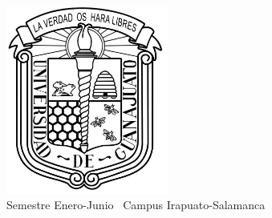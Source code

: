 \documentclass{report} %
\begin{document}
\begin{titlepage}
    \vfill

    \begin{center}
        \includegraphics[width=0.4\textwidth]{../img/logo_grande.jpg} \\ %
        \vspace{0.3cm}
        Semestre Enero-Junio \the\year \
        Campus Irapuato-Salamanca
    \end{center}
\end{titlepage}

\tableofcontents
\newpage











% 
\end{document}
